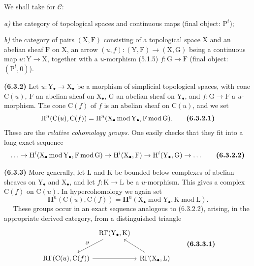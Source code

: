 \documentclass[11pt,leqno]{article}
\newcommand{\Page}[1]{\ifvmode\noindent\else\unskip\ \fi{\footnotesize\textcolor{gray}{[p.\,#1]}}\ \ignorespaces}
\begin{document}
We shall take for \(\mathscr{C}\):

\noindent
\textit{a)} the category of topological spaces and continuous maps (final object: \(\mathrm{P}^{t}\));

\noindent
\textit{b)} the category of pairs \((\mathrm{X},\mathrm{F})\) consisting of a topological space \(\mathrm{X}\) and an abelian sheaf \(\mathrm{F}\) on \(\mathrm{X}\), an arrow \((u,f):(\mathrm{Y},\mathrm{F})\to(\mathrm{X},\mathrm{G})\) being a continuous map \(u:\mathrm{Y}\to\mathrm{X}\), together with a \(u\)-morphism (5.1.5) \(f:\mathrm{G}\to\mathrm{F}\) (final object: \((\mathrm{P}^{t},0)\)).

\textbf{(6.3.2)} Let \(u:\mathrm{Y}_{\bullet}\to\mathrm{X}_{\bullet}\) be a morphism of simplicial topological spaces, with cone \(\mathrm{C}(u)\), \(\mathrm{F}\) an abelian sheaf on \(\mathrm{X}_{\bullet}\), \(\mathrm{G}\) an abelian sheaf on \(\mathrm{Y}_{\bullet}\), and \(f:\mathrm{G}\to\mathrm{F}\) a \(u\)-morphism. The cone \(\mathrm{C}(f)\) of \(f\) is an abelian sheaf on \(\mathrm{C}(u)\), and we set
\[
\mathrm{H}^{n}(\mathrm{C}(u),\mathrm{C}(f))
=\mathrm{H}^{n}(\mathrm{X}_{\bullet}\operatorname{mod}\mathrm{Y}_{\bullet},
\mathrm{F}\operatorname{mod}\mathrm{G}).
\tag*{\textbf{(6.3.2.1)}}
\]
These are the \textit{relative cohomology groups}. One easily checks that they fit into a long exact sequence
\[
\ldots\to
\mathrm{H}^{i}(\mathrm{X}_{\bullet}\operatorname{mod}\mathrm{Y}_{\bullet},
\mathrm{F}\operatorname{mod}\mathrm{G})
\to\mathrm{H}^{i}(\mathrm{X}_{\bullet},\mathrm{F})
\to\mathrm{H}^{i}(\mathrm{Y}_{\bullet},\mathrm{G})
\to\ldots
\tag*{\textbf{(6.3.2.2)}}
\]

\textbf{(6.3.3)} More generally, let \(\mathrm{L}\) and \(\mathrm{K}\) be bounded below complexes of abelian sheaves on \(\mathrm{Y}_{\bullet}\) and \(\mathrm{X}_{\bullet}\), and let \(f:\mathrm{K}\to\mathrm{L}\) be a \(u\)-morphism. This gives a complex \(\mathrm{C}(f)\) on \(\mathrm{C}(u)\). In hypercohomology we again set
\[
\mathbf{H}^{n}(\mathrm{C}(u),\mathrm{C}(f))
=\mathbf{H}^{n}(\mathrm{X}_{\bullet}\operatorname{mod}\mathrm{Y}_{\bullet},
\mathrm{K}\operatorname{mod}\mathrm{L}).
\]
\Page{22}
These groups occur in an exact sequence analogous to (6.3.2.2), arising, in the appropriate derived category, from a distinguished triangle
\[
\begin{tikzcd}[column sep=0.5em,row sep=2em]
& \mathrm{R}\Gamma(\mathrm{Y}_{\bullet},\mathrm{K})
  \arrow[dl,"\partial"'] & \\
\mathrm{R}\Gamma(\mathrm{C}(u),\mathrm{C}(f)) \arrow[rr]
& & \mathrm{R}\Gamma(\mathrm{X}_{\bullet},\mathrm{L}) \arrow[ul]
\end{tikzcd}
\tag*{\textbf{(6.3.3.1)}}
\]
\end{document}
